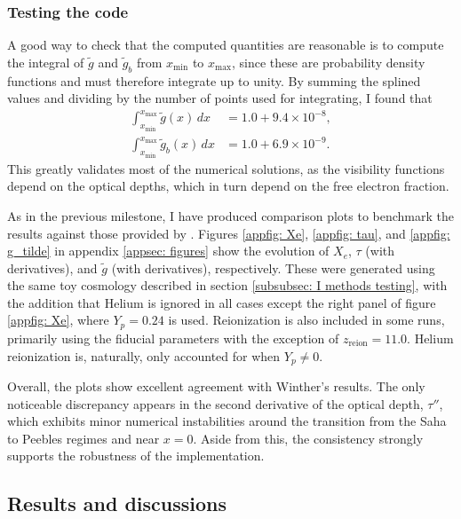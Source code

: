 \documentclass{aa}
\numberwithin{equation}{section}
\numberwithin{table}{section}
\numberwithin{figure}{section}
\begin{document}
\subsubsection{Testing the code}
A good way to check that the computed quantities are reasonable is to compute the integral of $\tilde{g}$ and $\tilde{g}_b$ from $x_\text{min}$ to $x_\text{max}$, since these are probability density functions and must therefore integrate up to unity. By summing the splined values and dividing by the number of points used for integrating, I found that
\begin{align*}
  \int_{x_\text{min}}^{x_\text{max}}\tilde{g}(x)\,dx &= 1.0+9.4\times10^{-8},
  \\
  \int_{x_\text{min}}^{x_\text{max}}\tilde{g}_b(x)\,dx &= 1.0+6.9\times10^{-9}.
\end{align*}
This greatly validates most of the numerical solutions, as the visibility functions depend on the optical depths, which in turn depend on the free electron fraction.

As in the previous milestone, I have produced comparison plots to benchmark the results against those provided by \cite{Course}. Figures \ref{appfig: Xe}, \ref{appfig: tau}, and \ref{appfig: g_tilde} in appendix \ref{appsec: figures} show the evolution of $X_e$, $\tau$ (with derivatives), and $\tilde{g}$ (with derivatives), respectively. These were generated using the same toy cosmology described in section \ref{subsubsec: I methods testing}, with the addition that Helium is ignored in all cases except the right panel of figure \ref{appfig: Xe}, where $Y_p = 0.24$ is used. Reionization is also included in some runs, primarily using the fiducial parameters with the exception of $z_\text{reion} = 11.0$. Helium reionization is, naturally, only accounted for when $Y_p \neq 0$.

Overall, the plots show excellent agreement with Winther's results. The only noticeable discrepancy appears in the second derivative of the optical depth, $\tau''$, which exhibits minor numerical instabilities around the transition from the Saha to Peebles regimes and near $x = 0$. Aside from this, the consistency strongly supports the robustness of the implementation.



\subsection{Results and discussions}\label{subsec: II results}
\end{document}
